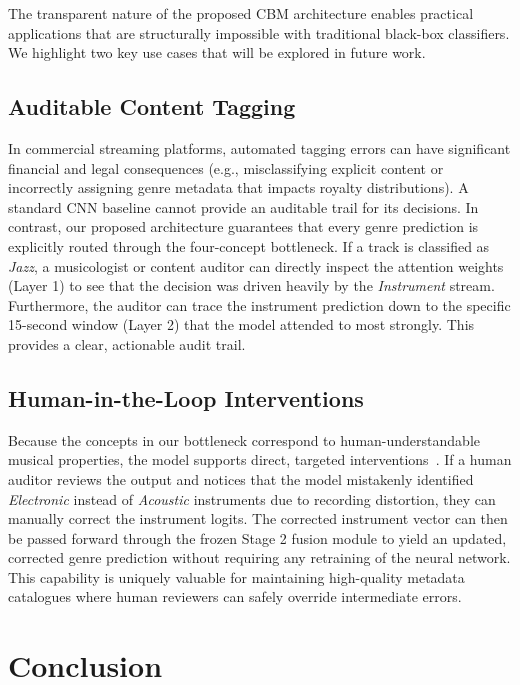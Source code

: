 \documentclass[sigconf,nonacm]{acmart}
\begin{document}
The transparent nature of the proposed CBM architecture enables practical applications that are structurally impossible with traditional black-box classifiers. We highlight two key use cases that will be explored in future work.

\subsection{Auditable Content Tagging}

In commercial streaming platforms, automated tagging errors can have significant financial and legal consequences (e.g., misclassifying explicit content or incorrectly assigning genre metadata that impacts royalty distributions). A standard CNN baseline cannot provide an auditable trail for its decisions. In contrast, our proposed architecture guarantees that every genre prediction is explicitly routed through the four-concept bottleneck. If a track is classified as \textit{Jazz}, a musicologist or content auditor can directly inspect the attention weights (Layer 1) to see that the decision was driven heavily by the \textit{Instrument} stream. Furthermore, the auditor can trace the instrument prediction down to the specific 15-second window (Layer 2) that the model attended to most strongly. This provides a clear, actionable audit trail.

\subsection{Human-in-the-Loop Interventions}

Because the concepts in our bottleneck correspond to human-understandable musical properties, the model supports direct, targeted interventions~\cite{koh2020concept}. If a human auditor reviews the output and notices that the model mistakenly identified \textit{Electronic} instead of \textit{Acoustic} instruments due to recording distortion, they can manually correct the instrument logits. The corrected instrument vector can then be passed forward through the frozen Stage 2 fusion module to yield an updated, corrected genre prediction without requiring any retraining of the neural network. This capability is uniquely valuable for maintaining high-quality metadata catalogues where human reviewers can safely override intermediate errors.

\section{Conclusion}
\end{document}
